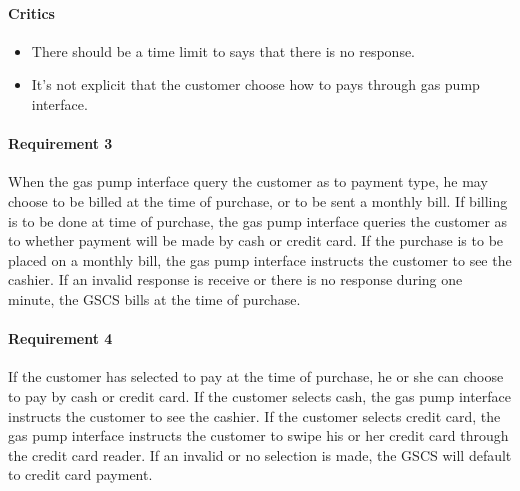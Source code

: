 \begin{framed}
    \paragraph{Critics} 
    \begin{itemize}
        \item There should be a time limit to says that there is no
            response.
        \item It's not explicit that the customer choose how to pays
            through gas pump interface.
    \end{itemize}

    \paragraph{Requirement 3} When the gas pump interface query the
    customer as to payment type, he may choose to be billed at the
    time of purchase, or to be sent a monthly bill. 
    If billing is to be done at time of purchase, the gas pump
    interface queries the customer as to whether payment will be
    made by cash or credit card. If the purchase is to be placed on
    a monthly bill, the gas pump interface instructs the customer to
    see the cashier. If an invalid response is receive or there is
    no response during one minute, the GSCS bills at the time of purchase.
\end{framed}

\paragraph{Requirement 4} If the customer has selected to pay at the time of
purchase, he or she can choose to pay by cash or credit card. If the
customer selects cash, the gas pump interface instructs the customer to see
the cashier. If the customer selects credit card, the gas pump interface
instructs the customer to swipe his or her credit card through the credit
card reader. If an invalid or no selection is made, the GSCS will default
to credit card payment.

